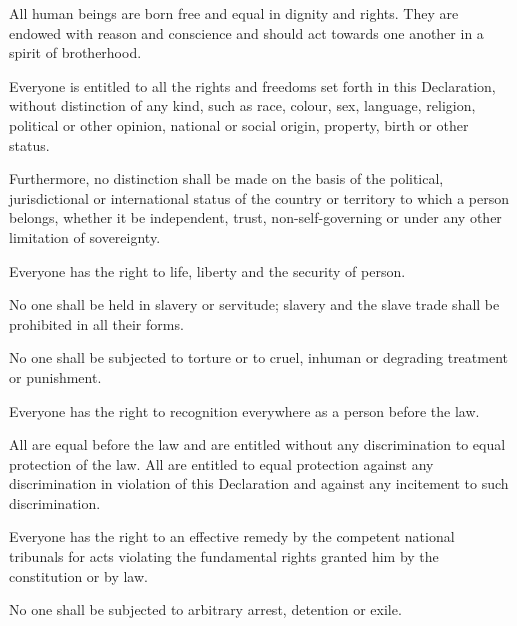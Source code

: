 \documentclass[a5paper]{article}
\begin{document}
%
\begin{para}All human beings are born free and equal in dignity and rights. They are endowed with reason and conscience and should act towards one another in a spirit of brotherhood.\end{para}
%
\begin{para}Everyone is entitled to all the rights and freedoms set forth in this Declaration, without distinction of any kind, such as race, colour, sex, language, religion, political or other opinion, national or social origin, property, birth or other status.\end{para}
\begin{para}Furthermore, no distinction shall be made on the basis of the political, jurisdictional or international status of the country or territory to which a person belongs, whether it be independent, trust, non-self-governing or under any other limitation of sovereignty.\end{para}
%
\begin{para}Everyone has the right to life, liberty and the security of person.\end{para}
%
\begin{para}No one shall be held in slavery or servitude; slavery and the slave trade shall be prohibited in all their forms.\end{para}
%
\begin{para}No one shall be subjected to torture or to cruel, inhuman or degrading treatment or punishment.\end{para}
%
\begin{para}Everyone has the right to recognition everywhere as a person before the law.\end{para}
%
\begin{para}All are equal before the law and are entitled without any discrimination to equal protection of the law. All are entitled to equal protection against any discrimination in violation of this Declaration and against any incitement to such discrimination.\end{para}
%
\begin{para}Everyone has the right to an effective remedy by the competent national tribunals for acts violating the fundamental rights granted him by the constitution or by law.\end{para}
%
\begin{para}No one shall be subjected to arbitrary arrest, detention or exile.\end{para}
\end{document}
